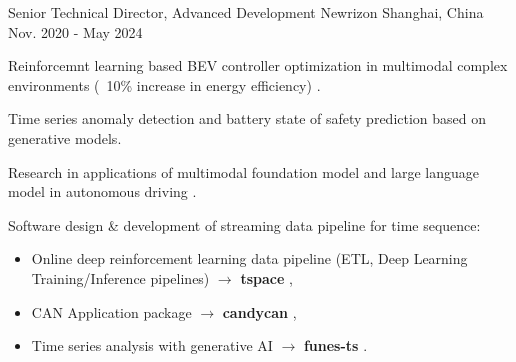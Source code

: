 \documentclass[../cv.tex]{subfiles}
\begin{document}


\begin{cventries}

  \cventry
    {Senior Technical Director, Advanced Development} %
    {Newrizon} %
    {Shanghai, China} %
    {Nov. 2020 - May 2024} %
    {
      \begin{cvitems} %
          \item Reinforcemnt learning based BEV controller optimization in multimodal complex environments (~10\% increase in energy efficiency)
          \supercite{Xin_VEOS_22} \supercite{Xin_Fu_Pan_Simulation_Test_RL_22} \supercite{Pan_Xin_DrvStyle_23}.
          \item Time series anomaly detection and battery state of safety prediction based on generative models. \supercite{Xin_GenAI_23} \supercite{Xin_Chen_NN_TSFeatures_23}
          \item Research in applications of multimodal foundation model and large language model in autonomous driving \supercite{Xin_LLM_24} \supercite{Xin_VLM_24} \supercite{Xin_Latent_Diffusion_23}.
          \item Software design \& development of streaming data pipeline for time sequence:
            \begin{itemize}
                    \item Online deep reinforcement learning data pipeline (ETL, Deep Learning Training/Inference pipelines) $\rightarrow$ \textbf{tspace} \href{https://binjian.github.io/tspace/}{\faGithub},
                    \item CAN Application package $\rightarrow$ \textbf{candycan} \href{https://binjian.github.io/candycan/}{\faGithub},
                    \item Time series analysis with generative AI $\rightarrow$ \textbf{funes-ts} \href{https://github.com/binjian/funes-ts/}{\faGithub}.
            \end{itemize}
      \end{cvitems}
    }


\end{cventries}
\end{document}
